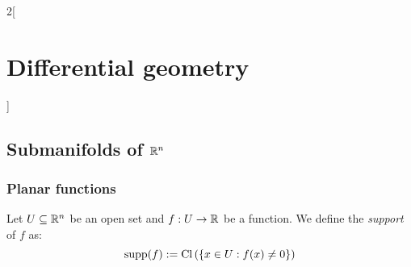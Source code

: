 \documentclass[../../../main.tex]{subfiles}
\begin{document}
\begin{multicols}{2}[\section{Differential geometry}]
  \subsection{Submanifolds of \texorpdfstring{$\mathbb{R}^n$}{Rn}}
  \subsubsection{Planar functions}
  \begin{definition}
    Let $U\subseteq\mathbb{R}^n$ be an open set and $f:U\rightarrow\mathbb{R}$ be a function. We define the \emph{support} of $f$ as:
    $$\operatorname{supp}(f):=\operatorname{Cl}\left(\{x\in U:f(x)\ne 0\}\right)$$
  \end{definition}
\end{multicols}
\end{document}
